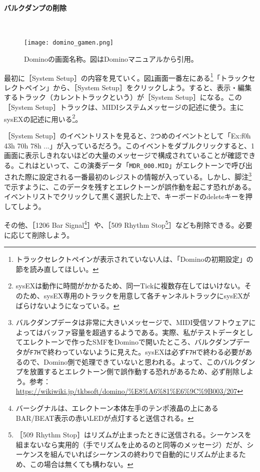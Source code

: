 \documentclass[uplatex, 10pt, dvipdfmx]{jsarticle}
\numberwithin{equation}{section}
\newcommand{\emphj}[1]{\textbf{\textrm{\textgt{{#1}}}}}
\begin{document}
\paragraph{バルクダンプの削除} \ 

\begin{figure}[h]
  \centering
  \texttt{[image: domino\_gamen.png]}
  \caption{Dominoの画面名称。図はDominoマニュアルから引用。}
  \label{figdominogamen}
\end{figure}


最初に［System Setup］の内容を見ていく。図\ref{figdominogamen}画面一番左にある\footnote{トラックセレクトペインが表示されていない人は、「Dominoの初期設定」の節を読み直してほしい。}「トラックセレクトペイン」から、［System Setup］をクリックしよう。すると、表示・編集するトラック（カレントトラックという）が［System Setup］になる。この［System Setup］トラックは、MIDIシステムメッセージの記述に使う。主にsysEXの記述に用いる\footnote{sysEXは動作に時間がかかるため、同一Tickに複数存在してはいけない。そのため、sysEX専用のトラックを用意して各チャンネルトラックにsysEXがばらけないようになっている。}。

［System Setup］のイベントリストを見ると、2つめのイベントとして「Ex:f0h 43h 70h 78h ...」が入っているだろう。このイベントをダブルクリックすると、1画面に表示しきれないほどの大量のメッセージで構成されていることが確認できる。これは\emphj{バルクダンプ}といって、この演奏データ「\texttt{MDR_000.MID}」がエレクトーンで呼び出された際に設定される一番最初のレジストの情報が入っている。しかし、脚注\footnote{バルクダンプデータは非常に大きいメッセージで、MIDI受信ソフトウェアによってはバッファ容量を超過するようである。実際、私がテストデータとしてエレクトーンで作ったSMFをDominoで開いたところ、バルクダンプデータが\texttt{F7H}で終わっていないように見えた。sysEXは必ず\texttt{F7H}で終わる必要があるので、Domino側で処理できていないと思われる。よって、このバルクダンプを放置するとエレクトーン側で誤作動する恐れがあるため、必ず削除しよう。参考：\url{https://wikiwiki.jp/tkbsoft/domino/%E8%A6%81%E6%9C%9B003/207}}で示すように、このデータを残すとエレクトーンが誤作動を起こす恐れがある。イベントリストでクリックして黒く選択した上で、キーボードのdeleteキーを押して\emphj{必ず削除}しよう。

その他、［1206 Bar Signal\footnote{バーシグナルは、エレクトーン本体左手のテンポ液晶の上にあるBAR/BEAT表示の赤いLEDが点灯すると送信される。}］や、［509 Rhythm Stop\footnote{［509 Rhythm Stop］はリズムが止まったときに送信される。シーケンスを組まないなら実用的（手でリズムを止めるのと同等のメッセージ）だが、シーケンスを組んでいればシーケンスの終わりで自動的にリズムが止まるため、この場合は無くても構わない。}］なども削除できる。必要に応じて削除しよう。
\end{document}
